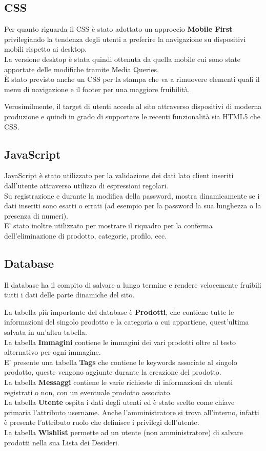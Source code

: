 \documentclass[a4paper, 11pt]{article}
\begin{document}
\subsection{CSS}
Per quanto riguarda il CSS è stato adottato un approccio \textbf{Mobile First} privilegiando la tendenza degli utenti a preferire la navigazione su dispositivi mobili rispetto ai desktop. \\
La versione desktop è stata quindi ottenuta da quella mobile cui sono state apportate delle modifiche tramite Media Queries. \\
È stato previsto anche un CSS per la stampa che va a rimuovere elementi quali il menu di navigazione e il footer per una maggiore fruibilità.

Verosimilmente, il target di utenti accede al sito attraverso dispositivi di moderna produzione e quindi in grado di supportare le recenti funzionalità sia HTML5 che CSS.

\subsection{JavaScript}
JavaScript è stato utilizzato per la validazione dei dati lato client inseriti dall’utente attraverso utilizzo di espressioni regolari.\\
Su registrazione e durante la modifica della password, mostra dinamicamente se i dati inseriti sono esatti o errati (ad esempio per la password la sua lunghezza o la presenza di numeri). \\
E’ stato inoltre utilizzato per mostrare il riquadro per la conferma dell’eliminazione di prodotto, categorie, profilo, ecc. \\


\subsection{Database}
Il database ha il compito di salvare a lungo termine e rendere velocemente fruibili tutti i dati delle parte dinamiche del sito. 

La tabella più importante del database è \textbf{Prodotti}, che contiene tutte le informazioni del singolo prodotto e la categoria a cui appartiene, quest’ultima salvata in un’altra tabella. \\
La tabella \textbf{Immagini} contiene le immagini dei vari prodotti oltre al testo alternativo per ogni immagine. \\
E’ presente una tabella \textbf{Tags} che contiene le keywords associate al singolo prodotto, queste vengono aggiunte durante la creazione del prodotto. \\
La tabella \textbf{Messaggi} contiene le varie richieste di informazioni da utenti registrati o non, con un eventuale prodotto associato.\\
La tabella \textbf{Utente} ospita i dati degli utenti ed è stato scelto come chiave primaria l’attributo username. 
Anche l’amministratore si trova all’interno, infatti è presente l’attributo ruolo che definisce i privilegi dell’utente. \\
La tabella \textbf{Wishlist} permette ad un utente (non amministratore) di salvare prodotti nella sua Lista dei Desideri.
\end{document}
